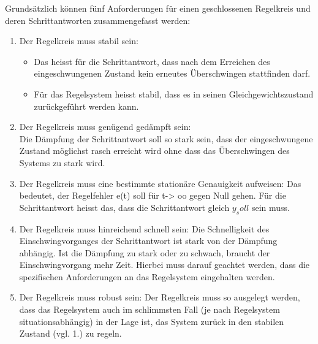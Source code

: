 Grunds\"atzlich  k\"onnen  f\"unf   Anforderungen  f\"ur  einen  geschlossenen
Regelkreis und deren Schrittantworten zusammengefasst werden:\\
\begin{enumerate}
    \item Der Regelkreis muss stabil sein:
        \begin{itemize}
            \item
                Das heisst  f\"ur die Schrittantwort, dass  nach dem Erreichen
                des  eingeschwungenen  Zustand kein  erneutes  \"Uberschwingen
                stattfinden darf.
            \item
                F\"ur  das  Regelsystem  heisst  stabil,  dass  es  in  seinen
                Gleichgewichtszustand zur\"uckgef\"uhrt werden kann.
        \end{itemize}
    \item
        Der Regelkreis  muss gen\"ugend ged\"ampft sein: \\Die  D\"ampfung der
        Schrittantwort soll  so stark  sein, dass der  eingeschwungene Zustand
        m\"oglichst  rasch erreicht  wird  ohne dass  das \"Uberschwingen  des
        Systems zu stark wird.
    \item
        Der   Regelkreis   muss   eine  bestimmte   station\"are   Genauigkeit
        aufweisen: Das  bedeutet,  der  Regelfehler  e(t) soll  f\"ur  t->  oo
        gegen  Null  gehen. F\"ur  die  Schrittantwort heisst  das,  dass  die
        Schrittantwort gleich $y_soll$ sein muss.
    \item
        Der Regelkreis  muss hinreichend  schnell sein: Die  Schnelligkeit des
        Einschwingvorganges der  Schrittantwort ist  stark von  der D\"ampfung
        abh\"angig. Ist die D\"ampfung  zu stark oder zu  schwach, braucht der
        Einschwingvorgang mehr Zeit. Hierbei muss darauf geachtet werden, dass
        die spezifischen Anforderungen an das Regelsystem eingehalten werden.
    \item
        Der  Regelkreis muss  robust  sein: Der Regelkreis  muss so  ausgelegt
        werden,  dass  das  Regelsystem  auch im  schlimmsten  Fall  (je  nach
        Regelsystem situationsabh\"angig) in der Lage ist, das System zur\"uck
        in den stabilen Zustand (vgl. 1.) zu regeln.
\end{enumerate}
